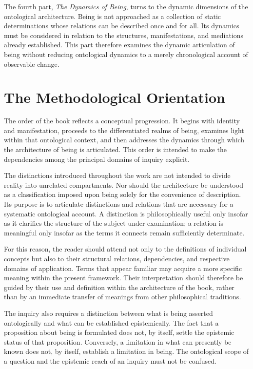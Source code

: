 The fourth part, \textit{The Dynamics of Being}, turns to the
dynamic dimensions of the ontological architecture. Being is
not approached as a collection of static determinations whose
relations can be described once and for all. Its dynamics
must be considered in relation to the structures, manifestations,
and mediations already established. This part therefore examines
the dynamic articulation of being without reducing ontological
dynamics to a merely chronological account of observable change.

\section*{The Methodological Orientation}

The order of the book reflects a conceptual progression. It
begins with identity and manifestation, proceeds to the
differentiated realms of being, examines light within that
ontological context, and then addresses the dynamics through
which the architecture of being is articulated. This order
is intended to make the dependencies among the principal
domains of inquiry explicit.

The distinctions introduced throughout the work are not
intended to divide reality into unrelated compartments. Nor
should the architecture be understood as a classification
imposed upon being solely for the convenience of description.
Its purpose is to articulate distinctions and relations that
are necessary for a systematic ontological account. A
distinction is philosophically useful only insofar as it
clarifies the structure of the subject under examination;
a relation is meaningful only insofar as the terms it connects
remain sufficiently determinate.

For this reason, the reader should attend not only to the
definitions of individual concepts but also to their structural
relations, dependencies, and respective domains of application.
Terms that appear familiar may acquire a more specific meaning
within the present framework. Their interpretation should
therefore be guided by their use and definition within the
architecture of the book, rather than by an immediate transfer
of meanings from other philosophical traditions.

The inquiry also requires a distinction between what is being
asserted ontologically and what can be established epistemically.
The fact that a proposition about being is formulated does not,
by itself, settle the epistemic status of that proposition.
Conversely, a limitation in what can presently be known does
not, by itself, establish a limitation in being. The ontological
scope of a question and the epistemic reach of an inquiry must
not be confused.

